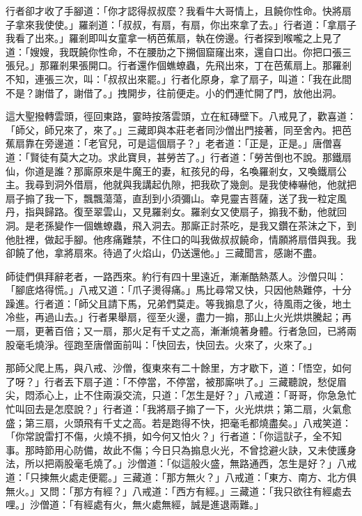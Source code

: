 行者卻才收了手腳道：「你才認得叔叔麼？我看牛大哥情上，且饒你性命。快將扇子拿來我使使。」羅剎道：「叔叔，有扇，有扇，你出來拿了去。」行者道：「拿扇子我看了出來。」羅剎即叫女童拿一柄芭蕉扇，執在傍邊。行者探到喉嚨之上見了道：「嫂嫂，我既饒你性命，不在腰肋之下搠個窟窿出來，還自口出。你把口張三張兒。」那羅剎果張開口。行者還作個蟭蟟蟲，先飛出來，丁在芭蕉扇上。那羅剎不知，連張三次，叫：「叔叔出來罷。」行者化原身，拿了扇子，叫道：「我在此間不是？謝借了，謝借了。」拽開步，往前便走。小的們連忙開了門，放他出洞。

這大聖撥轉雲頭，徑回東路，霎時按落雲頭，立在紅磚壁下。八戒見了，歡喜道：「師父，師兄來了，來了。」三藏即與本莊老者同沙僧出門接著，同至舍內。把芭蕉扇靠在旁邊道：「老官兒，可是這個扇子？」老者道：「正是，正是。」唐僧喜道：「賢徒有莫大之功。求此寶貝，甚勞苦了。」行者道：「勞苦倒也不說。那鐵扇仙，你道是誰？那廝原來是牛魔王的妻，紅孩兒的母，名喚羅剎女，又喚鐵扇公主。我尋到洞外借扇，他就與我講起仇隙，把我砍了幾劍。是我使棒嚇他，他就把扇子搧了我一下，飄飄蕩蕩，直刮到小須彌山。幸見靈吉菩薩，送了我一粒定風丹，指與歸路。復至翠雲山，又見羅剎女。羅剎女又使扇子，搧我不動，他就回洞。是老孫變作一個蟭蟟蟲，飛入洞去。那廝正討茶吃，是我又鑽在茶沫之下，到他肚裡，做起手腳。他疼痛難禁，不住口的叫我做叔叔饒命，情願將扇借與我。我卻饒了他，拿將扇來。待過了火焰山，仍送還他。」三藏聞言，感謝不盡。

師徒們俱拜辭老者，一路西來。約行有四十里遠近，漸漸酷熱蒸人。沙僧只叫：「腳底烙得慌。」八戒又道：「爪子燙得痛。」馬比尋常又快，只因他熱難停，十分躁進。行者道：「師父且請下馬，兄弟們莫走。等我搧息了火，待風雨之後，地土冷些，再過山去。」行者果舉扇，徑至火邊，盡力一搧，那山上火光烘烘騰起；再一扇，更著百倍；又一扇，那火足有千丈之高，漸漸燒著身體。行者急回，已將兩股毫毛燒淨。徑跑至唐僧面前叫：「快回去，快回去。火來了，火來了。」

那師父爬上馬，與八戒、沙僧，復東來有二十餘里，方才歇下，道：「悟空，如何了呀？」行者丟下扇子道：「不停當，不停當，被那廝哄了。」三藏聽說，愁促眉尖，悶添心上，止不住兩淚交流，只道：「怎生是好？」八戒道：「哥哥，你急急忙忙叫回去是怎麼說？」行者道：「我將扇子搧了一下，火光烘烘；第二扇，火氣愈盛；第三扇，火頭飛有千丈之高。若是跑得不快，把毫毛都燒盡矣。」八戒笑道：「你常說雷打不傷，火燒不損，如今何又怕火？」行者道：「你這獃子，全不知事。那時節用心防備，故此不傷；今日只為搧息火光，不曾捻避火訣，又未使護身法，所以把兩股毫毛燒了。」沙僧道：「似這般火盛，無路通西，怎生是好？」八戒道：「只揀無火處走便罷。」三藏道：「那方無火？」八戒道：「東方、南方、北方俱無火。」又問：「那方有經？」八戒道：「西方有經。」三藏道：「我只欲往有經處去哩。」沙僧道：「有經處有火，無火處無經，誠是進退兩難。」

